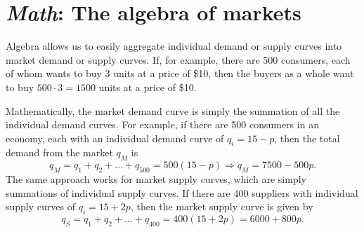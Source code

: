 \begin{comment}

\begin{table}[H]
\centering
\begin{tabular}{|lrrrrrr|} \hline
If the price were &0&1&2&3&4&5\\ \hline
Sellers would want to sell \hspace*{.8cm}&0&3&6&9&12&15\\ %
Buyers would want to buy &15&12&9&6&3&0\\ \hline
\end{tabular}
\caption{Supply and demand together}
\label{tab:yellow_blue_green}
\end{table}


\begin{figure}[H]
\centering
\begin{pspicture}(10,7)\showgrid(0,1)(10,6)
\rput(0,3){
    \psline[linecolor=black, linewidth=1.5pt](0,5)(10,1.67)
    \psline[linecolor=black, linewidth=1.5pt](0,0)(10,3.33)
    \pscircle[fillstyle=solid, linecolor=black, fillcolor=black](7.5,2.5){.2}
    \rput[r](-.6,1){\$1}
    \rput[r](-.6,2){\$2}
    \rput[r](-.6,3){\$3}
    \rput[r](-.6,4){\$4}
    \rput[r](-.6,5){\$5}
    \psaxes[labels=x, showorigin=false](10,5)}
\end{pspicture}
\caption{Supply and demand together}
\label{fig:yellow_blue_green} %
\end{figure}

\end{comment}

\section{\emph{Math}: The algebra of markets}

Algebra allows us to easily aggregate individual demand or supply curves into market demand or supply curves. If, for example, there are 500 consumers, each of whom wants to buy 3 units at a price of \$10, then the buyers as a whole want to buy $500\cdot 3 = 1500$ units at a price of \$10.

Mathematically, the market demand curve is simply the summation of all the individual demand curves. For example, if there are 500 consumers in an economy, each with an individual demand curve of $q_i=15-p$, then the total demand from the market $q_M$ is
\[
q_M=q_1+q_2+\ldots +q_{500} = 500(15-p)\Longrightarrow
q_M=7500-500p.
\]
The same approach works for market supply curves, which are simply summations of individual supply curves. If there are 400 suppliers with individual supply curves of $q_i=15+2p$, then the market supply curve is given by
\[
q_S=q_1+q_2+\ldots +q_{400}=400(15+2p)=6000+800p.
\]

